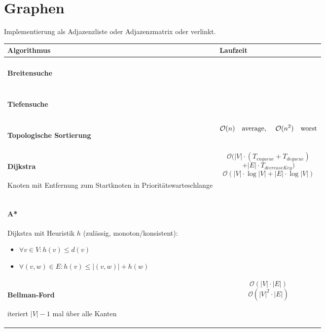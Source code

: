\section{Graphen}
Implementierung als Adjazenzliste oder Adjazenzmatrix oder verlinkt.

\begin{center}
\begin{tabular}{|p{.4\linewidth}|p{.5\linewidth}|}
\hline
Algorithmus		& Laufzeit	\\\hline\hline
\paragraph{Breitensuche}
\index{Algorithmen!Graphen!Breitensuche}
&
\\\hline
\paragraph{Tiefensuche}
\index{Algorithmen!Graphen!Tiefensuche}
&
\\\hline
\paragraph{Topologische Sortierung}
\index{Algorithmen!Graphen!Topologische
Sortierung} &
$$\mathcal{O}(n) \mbox{\quad average, \quad} \mathcal{O}(n^2) \mbox{\quad worst}$$
\\\hline\hline
\paragraph{Dijkstra}
\index{Algorithmen!Graphen!Dijkstra}
Knoten mit Entfernung zum Startknoten in Prioritätswarteschlange
&
$$\mathcal{O}(|V| \cdot (T_{enqueue} + T_{dequeue})$$
$$ + |E| \cdot T_{decreaseKey})$$
$$\mathcal{O}(|V| \cdot \log |V| + |E| \cdot \log |V|)$$
\\\hline
\paragraph{A*}
\index{Algorithmen!Graphen!A*}
Dijkstra mit Heuristik $h$ (zulässig, monoton/konsistent):
\begin{itemize}
\item $\forall v \in V: h(v) \leq d(v)$
\item $\forall (v, w) \in E: h(v) \leq |(v, w)| + h(w)$
\end{itemize}
&
\\\hline
\paragraph{Bellman-Ford}
\index{Algorithmen!Graphen!Bellman-Ford}
iteriert $|V|-1$ mal über alle Kanten
&
$$\mathcal{O}(|V| \cdot |E|)$$
$$\mathcal{O}(|V|^2 \cdot |E|)$$
\\\hline

\end{tabular}
\end{center}
